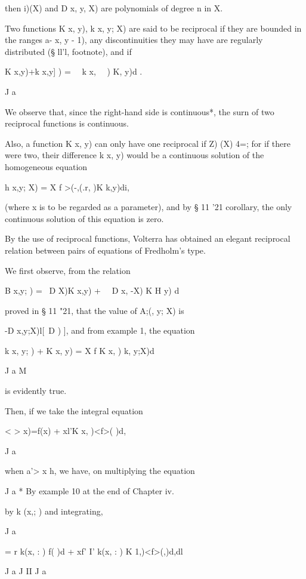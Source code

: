 then i)(X) and D x, y, X) are polynomials of degree n in X.


Two functions K x, y), k x, y; X) are said to be reciprocal if they
are bounded in the ranges a- x, y - 1), any discontinuities they may
have are regularly distributed (§ ll'l, footnote), and if

K x,y)+k x,y] ) = \ \ k x, \ \ ) K, y)d .

J a

We observe that, since the right-hand side is continuous*, the surn of
two reciprocal functions is continuous.

Also, a function K x, y) can only have one reciprocal if Z) (X) 4=;
for if there were two, their difference k x, y) would be a continuous
solution of the homogeneous equation

h x,y; X) = X f >(-,(.r, )K k,y)di,

(where x is to be regarded as a parameter), and by § 11 '21 corollary,
the only continuous solution of this equation is zero.

By the use of reciprocal functions, Volterra has obtained an elegant
reciprocal relation between pairs of equations of Fredholm's type.

We first observe, from the relation

B x,y; ) = \ D X)K x,y) + \ \ D x, -X) K H y) d

proved in § 11 "21, that the value of A;(, y; X) is

-D x,y;X)l[\ D ) ], and from example 1, the equation

k x, y; ) + K x, y) = X f K x, ) k, y;X)d

J a M

is evidently true.

Then, if we take the integral equation

< > x)=f(x) + xl'K x, )<f>( )d,

J a

when a'> x h, we have, on multiplying the equation

J a * By example 10 at the end of Chapter iv.

%
%

by k (x,; ) and integrating,

J a

= r k(x, : ) f( )d + xf' I' k(x, : ) K 1,)<f>(,)d,dl

J a J II J a

